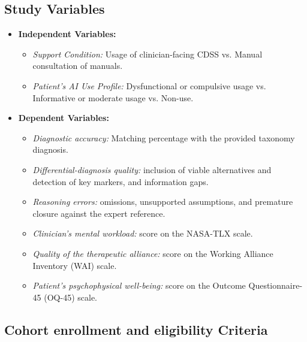 \documentclass[11pt,a4paper]{article}
\begin{document}
\subsection{Study Variables}

\begin{itemize}
    \item \textbf{Independent Variables:}
    \begin{itemize}
        \item \textit{Support Condition:} Usage of clinician-facing CDSS vs. Manual consultation of manuals.
        \item \textit{Patient's AI Use Profile:} Dysfunctional or compulsive usage vs. Informative or moderate usage vs. Non-use.
    \end{itemize}
    \item \textbf{Dependent Variables:}
    \begin{itemize}
        \item \textit{Diagnostic accuracy:} Matching percentage with the provided taxonomy diagnosis.
        \item \textit{Differential-diagnosis quality:} inclusion of viable alternatives and detection of key markers, and information gaps.
        \item \textit{Reasoning errors:} omissions, unsupported assumptions, and premature closure against the expert reference.
        \item \textit{Clinician's mental workload:} score on the NASA-TLX scale.
        \item \textit{Quality of the therapeutic alliance:} score on the Working Alliance Inventory (WAI) scale.
        \item \textit{Patient's psychophysical well-being:} score on the Outcome Questionnaire-45 (OQ-45) scale.
    \end{itemize}
\end{itemize}

\subsection{Cohort enrollment and eligibility Criteria}
\end{document}
